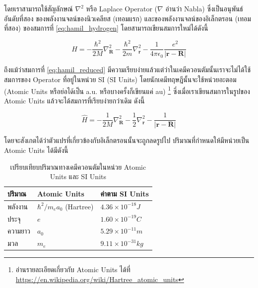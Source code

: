\noindent โดยเราสามารถใช้สัญลักษณ์ $\nabla^{2}$ หรือ Laplace Operator ($\nabla$ อ่านว่า Nabla) ซึ่งเป็นอนุพันธ์อันดับที่สอง%
ของพลังงานจลน์ของนิวเคลียส (เทอมแรก) และของพลังงานจลน์ของอิเล็กตรอน (เทอมที่สอง) ของสมการที่ \eqref{eq:hamil_hydrogen}
โดยสามารถเขียนสมการใหม่ได้ดังนี้

\begin{equation}\label{eq:hamil_reduced}
    \hat{H} = -\frac{\hbar^{2}}{2M} \nabla^{2}_{\bm{R}} - \frac{\hbar^{2}}{2m} \nabla^{2}_{\bm{r}}
    -\frac{1}{4\pi\epsilon_{0}}\frac{e^{2}}{|\bm{r}-\bm{R}|}
\end{equation}

ถึงแม้ว่าสมการที่ \eqref{eq:hamil_reduced} มีความเรียบง่ายแล้วแต่ว่าในเคมีควอนตัมนั้นเราจะไม่ได้ใช้สมการของ Operator ที่อยู่ในหน่วย
SI (SI Units) โดยนักเคมีทฤษฎีนั้นจะใช้หน่วยอะตอม (Atomic Units หรือย่อได้เป็น a.u. หรือบางครั้งก็เขียนแค่ au)%
\footnote{อ่านรายละเอียดเกี่ยวกับ Atomic Units ได้ที่ \url{https://en.wikipedia.org/wiki/Hartree_atomic_units}}
ซึ่งเมื่อเราเขียนสมการในรูปของ Atomic Units แล้วจะได้สมการที่เรียบง่ายกว่าเดิม ดังนี้

\begin{equation}\label{eq:hamil_au}
    \hat{H} = -\frac{1}{2M} \nabla^{2}_{\bm{R}}
    -\frac{1}{2} \nabla^{2}_{\bm{r}}
    -\frac{1}{|\bm{r}-\bm{R}|}
\end{equation}

\noindent โดยจะสังเกตได้ว่าตัวแปรที่เกี่ยวข้องกับอิเล็กตรอนนั้นจะถูกลดรูปไป ปริมาณที่กำหนดให้มีหน่วยเป็น Atomic Units ได้มีดังนี้

\begin{table}[H]
    \centering
    \caption{เปรียบเทียบปริมาณทางเคมีควอนตัมในหน่วย Atomic Units และ SI Units}
    \label{tab:atomic_units}
    \begin{tabular}{lll}\toprule
        \textbf{ปริมาณ} & \textbf{Atomic Units}             & \textbf{ค่าตาม SI Units}      \\\midrule
        พลังงาน         & $\hbar^{2}/m_{e}a_{0}$ (Hartree) & $4.36 \times 10^{-18} J$  \\
        ประจุ           & $e$                              & $1.60 \times 10^{-19} C$  \\
        ความยาว        & $a_{0}$                          & $5.29 \times 10^{-11} m$  \\
        มวล            & $m_{e}$                          & $9.11 \times 10^{-31} kg$ \\
        \bottomrule
    \end{tabular}
\end{table}

